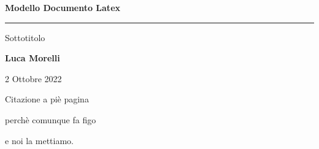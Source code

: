 \begin{titlepage}
	\begin{center}
	\huge \textbf{Modello Documento Latex}
	
	\rule{7cm}{0.4pt} 
	
	\LARGE Sottotitolo
	
	\vspace{40pt}
	
	\LARGE \textbf{Luca Morelli}
	
	\vspace{20pt}
	
	\LARGE 2 Ottobre 2022
	
	\end{center}
   
   \vspace{200pt}
   
    \begin{flushright}
    	Citazione a piè pagina
    	
    	perchè comunque fa figo
    	
    	e noi la mettiamo.
    \end{flushright}	
\end{titlepage}